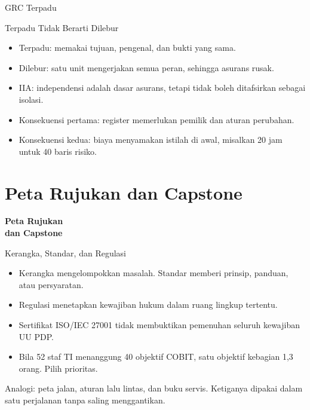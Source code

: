 \documentclass[aspectratio=169, table, 12pt]{beamer}
\begin{document}
\begin{frame}{{\Large GRC Terpadu}}
  \centering
  \resizebox{!}{0.74\textheight}{}
\end{frame}

\begin{frame}{{\Large Terpadu Tidak Berarti Dilebur}}
  \vspace{6pt}
  \small
  \begin{itemize}
    \item Terpadu: memakai tujuan, pengenal, dan bukti yang sama.
    \item Dilebur: satu unit mengerjakan semua peran, sehingga asurans rusak.
    \item IIA: independensi adalah dasar asurans, tetapi tidak boleh ditafsirkan sebagai isolasi.
    \item Konsekuensi pertama: register memerlukan pemilik dan aturan perubahan.
    \item Konsekuensi kedua: biaya menyamakan istilah di awal, misalkan 20 jam untuk 40 baris risiko.
  \end{itemize}
\end{frame}

\section{Peta Rujukan dan Capstone}

\begin{frame}{\hfill}
  \centering
  \Huge{\textbf{Peta Rujukan\\dan Capstone}}
\end{frame}

\begin{frame}{{\Large Kerangka, Standar, dan Regulasi}}
  \vspace{4pt}
  \small
  \begin{itemize}
    \item Kerangka mengelompokkan masalah. Standar memberi prinsip, panduan, atau persyaratan.
    \item Regulasi menetapkan kewajiban hukum dalam ruang lingkup tertentu.
    \item Sertifikat ISO/IEC 27001 tidak membuktikan pemenuhan seluruh kewajiban UU PDP.
    \item Bila 52 staf TI menanggung 40 objektif COBIT, satu objektif kebagian 1,3 orang. Pilih prioritas.
  \end{itemize}
  \vspace{4pt}
  {\footnotesize Analogi: peta jalan, aturan lalu lintas, dan buku servis. Ketiganya dipakai dalam
  satu perjalanan tanpa saling menggantikan.}
\end{frame}
\end{document}
